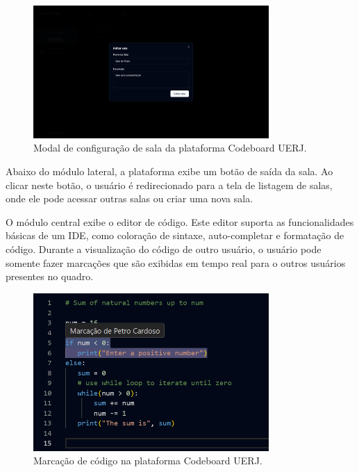\begin{figure}[H]
    \centering
    \includegraphics[width=0.8\textwidth]{assets/codeboard/edit-room-modal.png}
    \caption{Modal de configuração de sala da plataforma Codeboard UERJ.}
    \label{fig:edit-room-modal}
\end{figure}


Abaixo do módulo lateral, a plataforma exibe um botão de saída da sala. Ao clicar neste botão, o usuário é redirecionado para a tela de listagem de salas, onde ele pode acessar outras salas ou criar uma nova sala.

O módulo central exibe o editor de código. Este editor suporta as funcionalidades básicas de um IDE, como coloração de sintaxe, auto-completar e formatação de código. Durante a visualização do código de outro usuário, o usuário pode somente fazer marcações que são exibidas em tempo real para o outros usuários presentes no quadro.

\begin{figure}[H]
    \centering
    \includegraphics[width=0.8\textwidth]{assets/codeboard/code-editor-user-highlight.png}
    \caption{Marcação de código na plataforma Codeboard UERJ.}
    \label{fig:code-editor-user-highlight}
\end{figure}

